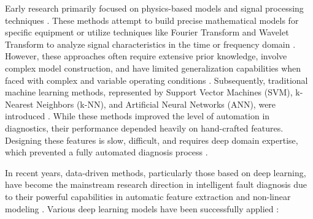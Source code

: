 Early research primarily focused on physics-based models and signal processing techniques \cite{lei2020applications}. These methods attempt to build precise mathematical models for specific equipment or utilize techniques like Fourier Transform and Wavelet Transform to analyze signal characteristics in the time or frequency domain \cite{liu2018artificial}. However, these approaches often require extensive prior knowledge, involve complex model construction, and have limited generalization capabilities when faced with complex and variable operating conditions \cite{liu2018artificial}. Subsequently, traditional machine learning methods, represented by Support Vector Machines (SVM), k-Nearest Neighbors (k-NN), and Artificial Neural Networks (ANN), were introduced \cite{zhao2019deep}. While these methods improved the level of automation in diagnostics, their performance depended heavily on hand-crafted features. Designing these features is slow, difficult, and requires deep domain expertise, which prevented a fully automated diagnosis process \cite{lei2020applications, zhao2019deep}.

In recent years, data-driven methods, particularly those based on deep learning, have become the mainstream research direction in intelligent fault diagnosis due to their powerful capabilities in automatic feature extraction and non-linear modeling \cite{zhao2019deep, zhang2019deep, khan2018review}. Various deep learning models have been successfully applied \cite{lei2020applications, zhang2019deep}:

